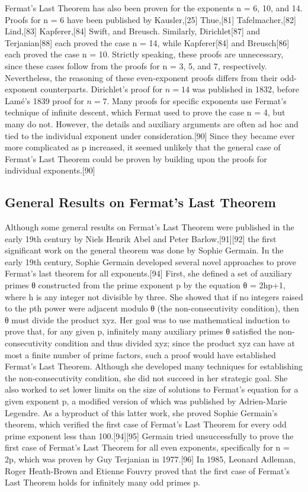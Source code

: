 \documentclass[12pt, a4paper, twoside]{article}
\numberwithin{equation}{section}
\begin{document}
Fermat's Last Theorem has also been proven for the exponents n = 6, 10, and 14. Proofs for n = 6 have been published by Kausler,[25] Thue,[81] Tafelmacher,[82] Lind,[83] Kapferer,[84] Swift, and Breusch. Similarly, Dirichlet[87] and Terjanian[88] each proved the case n = 14, while Kapferer[84] and Breusch[86] each proved the case n = 10. Strictly speaking, these proofs are unnecessary, since these cases follow from the proofs for n = 3, 5, and 7, respectively. Nevertheless, the reasoning of these even-exponent proofs differs from their odd-exponent counterparts. Dirichlet's proof for $n = 14$ was published in 1832, before Lamé's 1839 proof for $n = 7$. Many proofs for specific exponents use Fermat's technique of infinite descent, which Fermat used to prove the case n = 4, but many do not. However, the details and auxiliary arguments are often ad hoc and tied to the individual exponent under consideration.[90] Since they became ever more complicated as p increased, it seemed unlikely that the general case of Fermat's Last Theorem could be proven by building upon the proofs for individual exponents.[90]
\subsection{General Results on Fermat's Last Theorem}
 Although some general results on Fermat's Last Theorem were published in the early 19th century by Niels Henrik Abel and Peter Barlow,[91][92] the first significant work on the general theorem was done by Sophie Germain.
In the early 19th century, Sophie Germain developed several novel approaches to prove Fermat's last theorem for all exponents.[94] First, she defined a set of auxiliary primes θ constructed from the prime exponent p by the equation θ = 2hp+1, where h is any integer not divisible by three. She showed that if no integers raised to the pth power were adjacent modulo θ (the non-consecutivity condition), then θ must divide the product xyz. Her goal was to use mathematical induction to prove that, for any given p, infinitely many auxiliary primes θ satisfied the non-consecutivity condition and thus divided xyz; since the product xyz can have at most a finite number of prime factors, such a proof would have established Fermat's Last Theorem. Although she developed many techniques for establishing the non-consecutivity condition, she did not succeed in her strategic goal. She also worked to set lower limits on the size of solutions to Fermat's equation for a given exponent p, a modified version of which was published by Adrien-Marie Legendre. As a byproduct of this latter work, she proved Sophie Germain's theorem, which verified the first case of Fermat's Last Theorem for every odd prime exponent less than 100.[94][95] Germain tried unsuccessfully to prove the first case of Fermat's Last Theorem for all even exponents, specifically for n = 2p, which was proven by Guy Terjanian in 1977.[96] In 1985, Leonard Adleman, Roger Heath-Brown and Etienne Fouvry proved that the first case of Fermat's Last Theorem holds for infinitely many odd primes p.
\newpage
\end{document}
